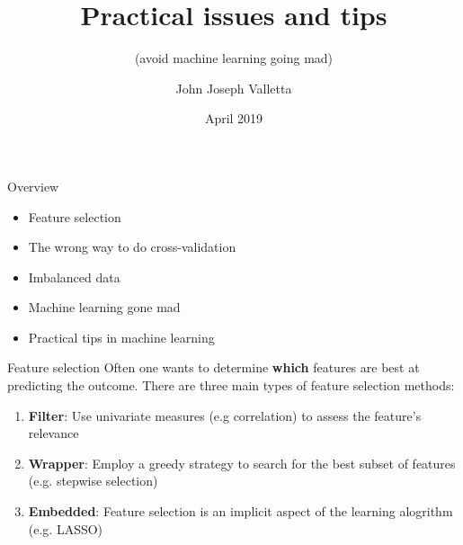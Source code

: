 \documentclass[pdf]{beamer}
\title[Practical issues and tips]{Practical issues and tips}
\subtitle{(avoid machine learning going mad)}
\author{John Joseph Valletta}
\date[April 2019]{April 2019}
\institute[]{University of Exeter, Penryn Campus, UK}
\begin{document}
\begin{frame}
\titlepage
\end{frame}

\begin{frame}{Overview}
\begin{itemize}\addtolength{\itemsep}{1.5\baselineskip}
	\item Feature selection
	\item The wrong way to do cross-validation
	\item Imbalanced data
	\item Machine learning gone mad
	\item Practical tips in machine learning
\end{itemize}
\end{frame}

\begin{frame}{Feature selection}
Often one wants to determine \textbf{which} features are best at predicting the 
outcome. There are three main types of feature selection methods:
\vfill
\begin{enumerate}\addtolength{\itemsep}{1.5\baselineskip}
	\item<2-> \textbf{Filter}: Use univariate measures (e.g correlation) to assess the feature's relevance
	\item<3-> \textbf{Wrapper}: Employ a greedy strategy to search for the best subset of features (e.g. stepwise selection)
	\item<4-> \textbf{Embedded}: Feature selection is an implicit aspect of the learning alogrithm (e.g. LASSO)
\end{enumerate} 
\end{frame}
\end{document}
